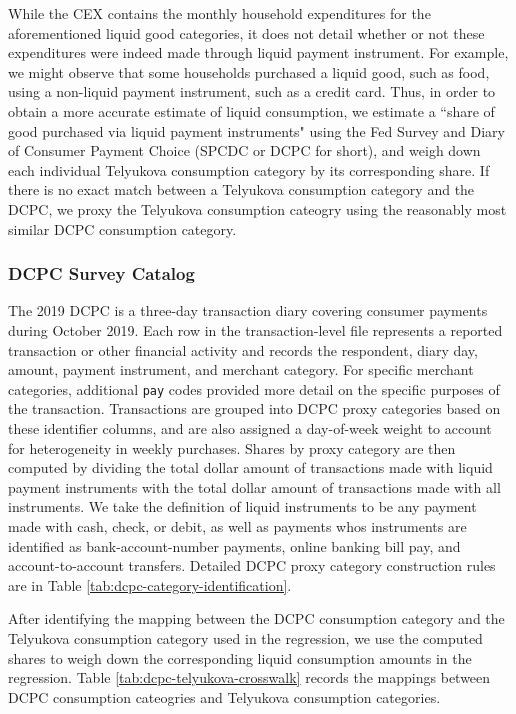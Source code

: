 \documentclass[11pt]{article}
\begin{document}
While the CEX contains the monthly household expenditures for the aforementioned liquid good categories, it does not detail whether or not these expenditures were indeed made through liquid payment instrument. For example, we might observe that some households purchased a liquid good, such as food, using a non-liquid payment instrument, such as a credit card. Thus, in order to obtain a more accurate estimate of liquid consumption, we estimate a ``share of good purchased via liquid payment instruments" using the Fed Survey and Diary of Consumer Payment Choice (SPCDC or DCPC for short), and weigh down each individual Telyukova consumption category by its corresponding share. If there is no exact match between a Telyukova consumption category and the DCPC, we proxy the Telyukova consumption cateogry using the reasonably most similar DCPC consumption category. 

\subsubsection{DCPC Survey Catalog} 

The 2019 DCPC is a three-day transaction diary covering consumer payments during October 2019. Each row in the transaction-level file represents a reported transaction or other financial activity and records the respondent, diary day, amount, payment instrument, and merchant category. For specific merchant categories, additional \lstinline|pay| codes provided more detail on the specific purposes of the transaction. Transactions are grouped into DCPC proxy categories based on these identifier columns, and are also assigned a day-of-week weight to account for heterogeneity in weekly purchases. Shares by proxy category are then computed by dividing the total dollar amount of transactions made with liquid payment instruments with the total dollar amount of transactions made with all instruments. We take the definition of liquid instruments to be any payment made with cash, check, or debit, as well as payments whos instruments are identified as bank-account-number payments, online banking bill pay, and account-to-account transfers. Detailed DCPC proxy category construction rules are in Table \ref{tab:dcpc-category-identification}. 

After identifying the mapping between the DCPC consumption category and the Telyukova consumption category used in the regression, we use the computed shares to weigh down the corresponding liquid consumption amounts in the regression. Table \ref{tab:dcpc-telyukova-crosswalk} records the mappings between DCPC consumption cateogries and Telyukova consumption categories.
\end{document}
